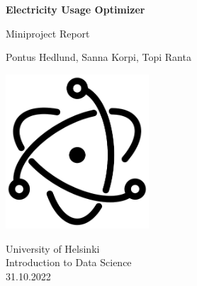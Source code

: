 \begin{titlepage}
    \begin{center}
        \vspace*{1cm}
            
        \Huge
        \textbf{Electricity Usage Optimizer}
            
        \vspace{0.5cm}
        \LARGE
        Miniproject Report
        
        \date{today}
            
        \vspace{1.5cm}
            
        Pontus Hedlund, Sanna Korpi, Topi Ranta
            
            

            
        \vspace{2.4cm}
            
        \includegraphics[width=0.4\textwidth]{report/images/elec-logo.png}
        
        \vfill
            
        \Large
        University of Helsinki\\
        Introduction to Data Science\\
        31.10.2022\\
            
    \end{center}
\end{titlepage}